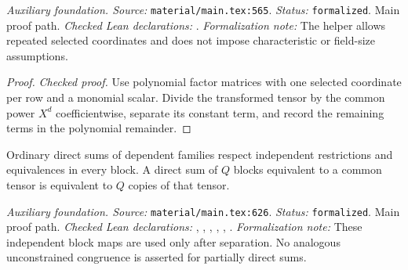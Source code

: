 \noindent\textit{Auxiliary foundation. Source:} \texttt{material/main.tex:565}.
\textit{Status:} \texttt{formalized}. Main proof path.
\textit{Checked Lean declarations:} .
\textit{Formalization note:} The helper allows repeated selected coordinates and does not impose characteristic or field-size assumptions.

\begin{proof}
\leanok
{}
\textit{Checked proof.} Use polynomial factor matrices with one selected coordinate per row and a monomial scalar. Divide the transformed tensor by the common power $X^d$ coefficientwise, separate its constant term, and record the remaining terms in the polynomial remainder.
\end{proof}

\renewcommand{\thetheorem}{A66}
\begin{lemma}
\label{aux:ordinary-sum-block-transport}
\leanok
Ordinary direct sums of dependent families respect independent restrictions and equivalences in every block. A direct sum of $Q$ blocks equivalent to a common tensor is equivalent to $Q$ copies of that tensor.
\end{lemma}

\noindent\textit{Auxiliary foundation. Source:} \texttt{material/main.tex:626}.
\textit{Status:} \texttt{formalized}. Main proof path.
\textit{Checked Lean declarations:} , , , , , .
\textit{Formalization note:} These independent block maps are used only after separation. No analogous unconstrained congruence is asserted for partially direct sums.

